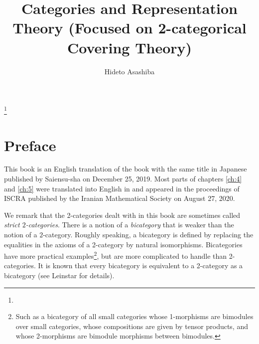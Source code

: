 \documentclass{surv-l}
\numberwithin{equation}{chapter}
\numberwithin{figure}{chapter}
\theoremstyle{plain}
\theoremstyle{definition}
\theoremstyle{remark}
\begin{document}
\frontmatter 
\setcounter{page}{5}


\title[Categories and Representation Theory]
{Categories and Representation Theory (Focused on 2-categorical Covering Theory)}
\author{Hideto Asashiba}
\address{Department of Mathematics,
 Faculty of Science, Shizuoka University,
Ohya 836, Suruga-ku, Shizuoka, 422-8529, Japan}
\thanks{}
\maketitle


\tableofcontents

\chapter*{Preface}
This book is an English translation of the book \cite{Asa19}
with the same title in Japanese published by Saiensu-sha on December 25, 2019.
Most parts of chapters \ref{ch:4} and \ref{ch:5} were translated into English in \cite{Asa20}
and appeared in the proceedings of ISCRA published by the Iranian Mathematical Society on August 27, 2020.

We remark that the 2-categories dealt with in this book
are sometimes called {\em strict $2$-categories}.
There is a notion of a {\em bicategory} that is weaker than the notion of a $2$-category.
Roughly speaking, a bicategory is defined by replacing the equalities
in the axioms of a 2-category by natural isomorphisms.
Bicategories have more practical examples\footnote{Such as a bicategory of all small categories
whose 1-morphisms are bimodules over small categories,
whose compositions are given by tensor products, and whose
2-morphisms are bimodule morphisms between bimodules.},
but are more complicated to handle than 2-categories.
It is known that every bicategory is equivalent to a 2-category
as a bicategory (see Leinstar \cite{Lei} for details).
\end{document}
